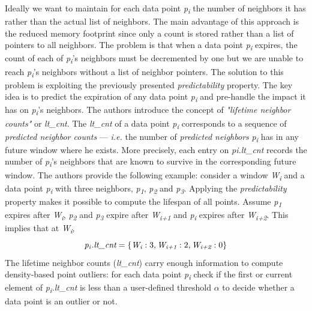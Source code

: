 Ideally we want to maintain for each data point \textit{p\textsubscript{i}} the number of neighbors it has rather than the actual list of neighbors. The main advantage of this approach is the reduced memory footprint since only a count is stored rather than a list of pointers to all neighbors. The problem is that when a data point \textit{p\textsubscript{i}} expires, the count of each of \textit{p\textsubscript{i}}'s neighbors must be decremented by one but we are unable to reach \textit{p\textsubscript{i}}'s neighbors without a list of neighbor pointers. The solution to this problem is exploiting the previously presented \textit{predictability} property. The key idea is to predict the expiration of any data point \textit{p\textsubscript{i}} and pre-handle the impact it has on \textit{p\textsubscript{i}}'s neighbors. The authors introduce the concept of \textit{"lifetime neighbor counts"} or \textit{lt\_cnt}. The \textit{lt\_cnt} of a data point \textit{p\textsubscript{i}} corresponds to a sequence of \textit{predicted neighbor counts} --- \textit{i.e.} the number of \textit{predicted neighbors} \textit{p\textsubscript{i}} has in any future window where he exists. More precisely, each entry on \textit{pi.lt\_cnt} records the number of \textit{p\textsubscript{i}}'s neighbors that are known to survive in the corresponding future window. The authors provide the following example: consider a window \textit{W\textsubscript{i}} and a data point \textit{p\textsubscript{i}} with three neighbors, \textit{p\textsubscript{1}}, \textit{p\textsubscript{2}} and \textit{p\textsubscript{3}}. Applying the \textit{predictability} property makes it possible to compute the lifespan of all points. Assume \textit{p\textsubscript{1}} expires after \textit{W\textsubscript{i}}, \textit{p\textsubscript{2}} and \textit{p\textsubscript{3}} expire after \textit{W\textsubscript{i+1}} and \textit{p\textsubscript{i}} expires after \textit{W\textsubscript{i+2}}. This implies that at \textit{W\textsubscript{i}}, 
\[ \textit{p\textsubscript{i}.lt\_cnt} = \{\textit{W\textsubscript{i}}: 3, \textit{W\textsubscript{i+1}}: 2, \textit{W\textsubscript{i+2}}: 0\} \]
The lifetime neighbor counts (\textit{lt\_cnt}) carry enough information to compute density-based point outliers: for each data point \textit{p\textsubscript{i}} check if the first or current element of \textit{p\textsubscript{i}.lt\_cnt} is less than a user-defined threshold $\alpha$ to decide whether a data point is an outlier or not.


